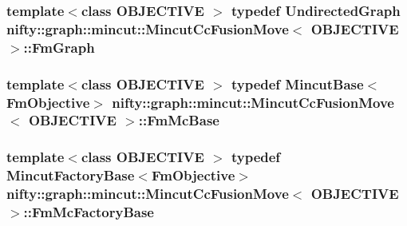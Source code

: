\subsubsection[{Fm\+Graph}]{\setlength{\rightskip}{0pt plus 5cm}template$<$class O\+B\+J\+E\+C\+T\+I\+V\+E $>$ typedef {\bf Undirected\+Graph} {\bf nifty\+::graph\+::mincut\+::\+Mincut\+Cc\+Fusion\+Move}$<$ O\+B\+J\+E\+C\+T\+I\+V\+E $>$\+::{\bf Fm\+Graph}}\label{classnifty_1_1graph_1_1mincut_1_1MincutCcFusionMove_a0c57954c08357717ac192ee1836f15b1}
\hypertarget{classnifty_1_1graph_1_1mincut_1_1MincutCcFusionMove_a837067e538884c816f5f2753a9ebcb30}{}
\subsubsection[{Fm\+Mc\+Base}]{\setlength{\rightskip}{0pt plus 5cm}template$<$class O\+B\+J\+E\+C\+T\+I\+V\+E $>$ typedef {\bf Mincut\+Base}$<${\bf Fm\+Objective}$>$ {\bf nifty\+::graph\+::mincut\+::\+Mincut\+Cc\+Fusion\+Move}$<$ O\+B\+J\+E\+C\+T\+I\+V\+E $>$\+::{\bf Fm\+Mc\+Base}}\label{classnifty_1_1graph_1_1mincut_1_1MincutCcFusionMove_a837067e538884c816f5f2753a9ebcb30}
\hypertarget{classnifty_1_1graph_1_1mincut_1_1MincutCcFusionMove_a6246ad240ba42965159b1186402d8394}{}
\subsubsection[{Fm\+Mc\+Factory\+Base}]{\setlength{\rightskip}{0pt plus 5cm}template$<$class O\+B\+J\+E\+C\+T\+I\+V\+E $>$ typedef {\bf Mincut\+Factory\+Base}$<${\bf Fm\+Objective}$>$ {\bf nifty\+::graph\+::mincut\+::\+Mincut\+Cc\+Fusion\+Move}$<$ O\+B\+J\+E\+C\+T\+I\+V\+E $>$\+::{\bf Fm\+Mc\+Factory\+Base}}\label{classnifty_1_1graph_1_1mincut_1_1MincutCcFusionMove_a6246ad240ba42965159b1186402d8394}
\hypertarget{classnifty_1_1graph_1_1mincut_1_1MincutCcFusionMove_a5b3284792834859af236031c18ee1c6d}{}
